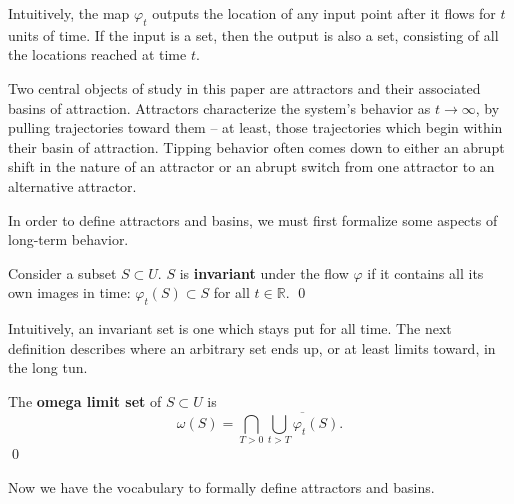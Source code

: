 Intuitively, the map $\varphi_t$ outputs the location of any input point after it flows for $t$ units of time. If the input is a set, then the output is also a set, consisting of all the locations reached at time $t$.

Two central objects of study in this paper are attractors and their associated basins of attraction. Attractors characterize the system's behavior as $t \to \infty$, by pulling trajectories toward them -- at least, those trajectories which begin within their basin of attraction. Tipping behavior often comes down to either an abrupt shift in the nature of an attractor or an abrupt switch from one attractor to an alternative attractor. 

In order to define attractors and basins, we must first formalize some aspects of long-term behavior.

\begin{definition}
	Consider a subset $S \subset U$. 
	$S$ is \textbf{invariant} under the flow $\varphi$ if it contains all its own images in time: $\varphi_t(S) \subset S$ for all $t \in \mathbb{R}$.
	\qed
\end{definition}

Intuitively, an invariant set is one which stays put for all time. %
The next definition describes where an arbitrary set ends up, or at least limits toward, in the long tun. 

\begin{definition}
	The \textbf{omega limit set} of $S \subset U$ is $$\omega(S)
	= \bigcap \limits_{T > 0} \overline{ \bigcup\limits_{t > T} \varphi_t(S) }.$$ \qed
\end{definition}


Now we have the vocabulary to formally define attractors and basins.

